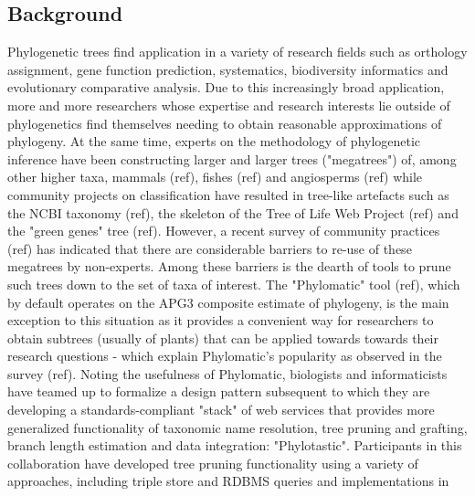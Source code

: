 \documentclass[10pt]{bmc_article}
\newenvironment{bmcformat}{\begin{raggedright}\baselineskip20pt\sloppy\setboolean{publ}{false}}{\end{raggedright}\baselineskip20pt\sloppy}
\begin{document}
\begin{bmcformat}
\section*{Background}
Phylogenetic trees find application in a variety of research fields such as
orthology assignment, gene function prediction, systematics, biodiversity 
informatics and evolutionary comparative analysis. Due to this increasingly 
broad application, more and more researchers whose expertise and research 
interests lie outside of phylogenetics find themselves needing to obtain 
reasonable approximations of phylogeny. At the same time, experts on the 
methodology of phylogenetic inference have been constructing larger and 
larger trees ("megatrees") of, among other higher taxa, mammals (ref), 
fishes (ref) and angiosperms (ref) while community projects on classification 
have resulted in tree-like artefacts such as the NCBI taxonomy (ref), the 
skeleton of the Tree of Life Web Project (ref) and the "green genes" tree (ref). 
However, a recent survey of community practices (ref) has indicated that there 
are considerable barriers to re-use of these megatrees by non-experts. Among 
these barriers is the dearth of tools to prune such trees down to the set of 
taxa of interest. The "Phylomatic" tool (ref), which by default operates on the 
APG3 composite estimate of phylogeny, is the main exception to this situation as 
it provides a convenient way for researchers to obtain subtrees (usually of 
plants) that can be applied towards towards their research questions - which 
explain Phylomatic's popularity as observed in the survey (ref). Noting the 
usefulness of Phylomatic, biologists and informaticists have teamed 
up to formalize a design pattern subsequent to which they are developing a 
standards-compliant "stack" of web services that provides more generalized 
functionality of taxonomic name resolution, tree pruning and grafting, branch 
length estimation and data integration: "Phylotastic". Participants in this
collaboration have developed tree pruning functionality using a variety of
approaches, including triple store and RDBMS queries and implementations in

\end{bmcformat}
\end{document}
